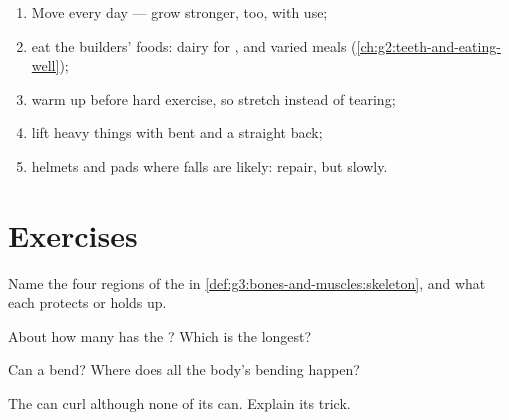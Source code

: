\begin{method}\label{met:g3:bones-and-muscles:care}
\begin{enumerate}
  \item Move every day ---  grow stronger,  too, with
        use;
  \item eat the builders' foods: dairy for , and varied
        meals (\cref{ch:g2:teeth-and-eating-well});
  \item warm up before hard exercise, so  stretch instead
        of tearing;
  \item lift heavy things with bent  and a straight back;
  \item helmets and pads where falls are likely:  repair,
        but slowly.
\end{enumerate}
\end{method}

\section{Exercises}

\begin{exercise}[$\star$]\label{exo:g3:bones-and-muscles:1}
Name the four regions of the  in
\cref{def:g3:bones-and-muscles:skeleton}, and what each
protects or holds up.
\end{exercise}

\begin{exercise}[$\star$]\label{exo:g3:bones-and-muscles:2}
About how many  has the ? Which is the longest?
\end{exercise}

\begin{exercise}[$\star$]\label{exo:g3:bones-and-muscles:3}
Can a  bend? Where does all the body's bending happen?
\end{exercise}

\begin{exercise}[$\star$]\label{exo:g3:bones-and-muscles:4}
The  can curl although none of its  can. Explain its
trick.
\end{exercise}


